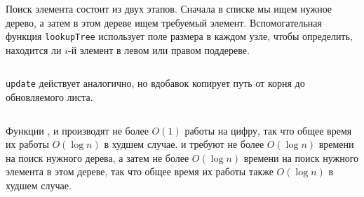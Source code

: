 \begin{frame}[fragile]{}

Поиск элемента
состоит из двух этапов. Сначала в списке мы ищем нужное дерево, а
затем в этом дереве ищем требуемый элемент. Вспомогательная функция
\lstinline!lookupTree! использует поле размера в каждом узле, чтобы
определить, находится ли $i$-й элемент в левом или правом
поддереве.
\inputminted[firstline=34,lastline=44,gobble=2]{haskell}{code/BinaryRandomAccessList.lhs}
\end{frame}

\begin{frame}[fragile]{}
\lstinline!update! действует аналогично, но вдобавок копирует путь от
корня до обновляемого листа.
\inputminted[firstline=48,lastline=60,gobble=2]{haskell}{code/BinaryRandomAccessList.lhs}


%
\end{frame}

\begin{frame}[fragile]{}

Функции ,  и 
производят не более $O(1)$ работы на цифру, так что общее время их
работы $O(\log n)$ в худшем случае.  и
 требуют не более $O(\log n)$ времени на поиск
нужного дерева, а затем не более $O(\log n)$ времени на поиск нужного
элемента в этом дереве, так что общее время их работы также $O(\log
n)$ в худшем случае.

\end{frame}

